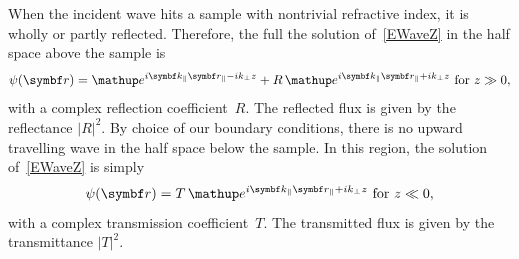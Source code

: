 When the incident wave hits a sample with nontrivial refractive index,
it is wholly or partly reflected.
Therefore, the full the solution of~\cref{EWaveZ} in the half space above the sample is
\begin{equation}
  \psi(\r) = \e^{i\k_\parallel\r_\parallel-ik_{\perp} z} +
      R\, \e^{i\k_\parallel\r_\parallel+ik_{\perp} z}
  \text{ for }z\gg0,
\end{equation}
with a complex reflection coefficient~$R$.
%
The reflected flux is given by the re\-flect\-an\-ce $|R|^2$.
%
%
By choice of our boundary conditions,
there is no upward travelling wave in the half space below the sample.
In this region, the solution of~\cref{EWaveZ} is simply
\begin{equation}
  \psi(\r) = T\, \e^{i\k_\parallel\r_\parallel+ik_{\perp} z}
  \text{ for }z\ll0,
\end{equation}
with a complex transmission coefficient~$T$.
The transmitted flux is given by the transmittance $|T|^2$.
%
%

